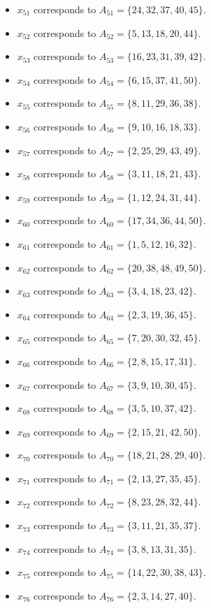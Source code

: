 \documentclass[11pt]{article}
\begin{document}
\begin{itemize}
\item $x_{51}$ corresponds to $A_{51}=\{24, 32, 37, 40, 45\}$.
\item $x_{52}$ corresponds to $A_{52}=\{5, 13, 18, 20, 44\}$.
\item $x_{53}$ corresponds to $A_{53}=\{16, 23, 31, 39, 42\}$.
\item $x_{54}$ corresponds to $A_{54}=\{6, 15, 37, 41, 50\}$.
\item $x_{55}$ corresponds to $A_{55}=\{8, 11, 29, 36, 38\}$.
\item $x_{56}$ corresponds to $A_{56}=\{9, 10, 16, 18, 33\}$.
\item $x_{57}$ corresponds to $A_{57}=\{2, 25, 29, 43, 49\}$.
\item $x_{58}$ corresponds to $A_{58}=\{3, 11, 18, 21, 43\}$.
\item $x_{59}$ corresponds to $A_{59}=\{1, 12, 24, 31, 44\}$.
\item $x_{60}$ corresponds to $A_{60}=\{17, 34, 36, 44, 50\}$.
\item $x_{61}$ corresponds to $A_{61}=\{1, 5, 12, 16, 32\}$.
\item $x_{62}$ corresponds to $A_{62}=\{20, 38, 48, 49, 50\}$.
\item $x_{63}$ corresponds to $A_{63}=\{3, 4, 18, 23, 42\}$.
\item $x_{64}$ corresponds to $A_{64}=\{2, 3, 19, 36, 45\}$.
\item $x_{65}$ corresponds to $A_{65}=\{7, 20, 30, 32, 45\}$.
\item $x_{66}$ corresponds to $A_{66}=\{2, 8, 15, 17, 31\}$.
\item $x_{67}$ corresponds to $A_{67}=\{3, 9, 10, 30, 45\}$.
\item $x_{68}$ corresponds to $A_{68}=\{3, 5, 10, 37, 42\}$.
\item $x_{69}$ corresponds to $A_{69}=\{2, 15, 21, 42, 50\}$.
\item $x_{70}$ corresponds to $A_{70}=\{18, 21, 28, 29, 40\}$.
\item $x_{71}$ corresponds to $A_{71}=\{2, 13, 27, 35, 45\}$.
\item $x_{72}$ corresponds to $A_{72}=\{8, 23, 28, 32, 44\}$.
\item $x_{73}$ corresponds to $A_{73}=\{3, 11, 21, 35, 37\}$.
\item $x_{74}$ corresponds to $A_{74}=\{3, 8, 13, 31, 35\}$.
\item $x_{75}$ corresponds to $A_{75}=\{14, 22, 30, 38, 43\}$.
\item $x_{76}$ corresponds to $A_{76}=\{2, 3, 14, 27, 40\}$.

\end{itemize}
\end{document}

